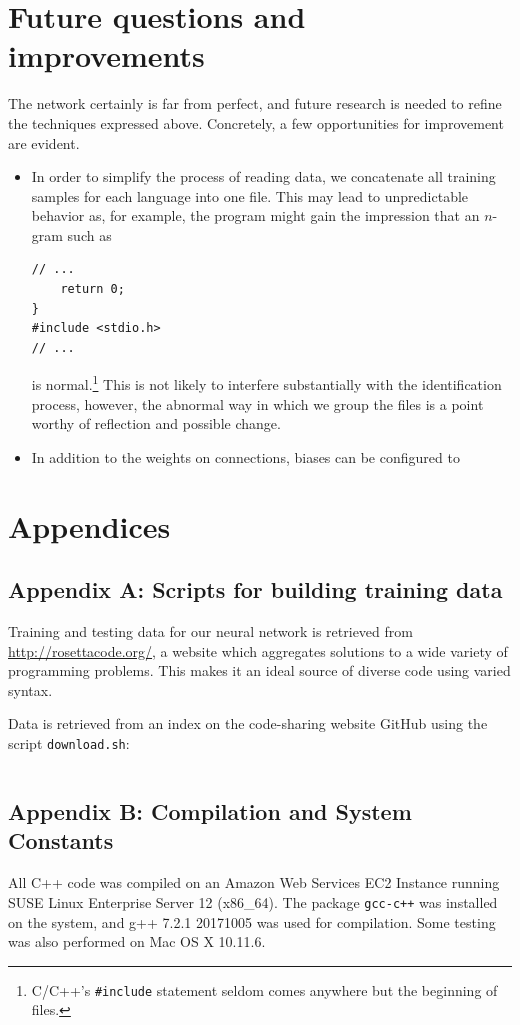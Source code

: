 \documentclass{article}
\begin{document}
\section{Future questions and improvements}
The network certainly is far from perfect, and future research is needed to refine the techniques expressed above. Concretely, a few opportunities for improvement are evident.
\begin{itemize}
  \item{In order to simplify the process of reading data, we concatenate all training samples for each language into one file. This may lead to unpredictable behavior as, for example, the program might gain the impression that an $n$-gram such as
  \begin{verbatim}
// ...
    return 0;
}
#include <stdio.h>
// ...
  \end{verbatim}
  is normal.\footnote{C/C++'s \texttt{\#include} statement seldom comes anywhere but the beginning of files.} This is not likely to interfere substantially with the identification process, however, the abnormal way in which we group the files is a point worthy of reflection and possible change.}
  \item{In addition to the weights on connections, biases can be configured to }

\end{itemize}


\section{Appendices}

\label{sec:appendix_a}
\subsection{Appendix A: Scripts for building training data}
Training and testing data for our neural network is retrieved from \url{http://rosettacode.org/}, a website which aggregates solutions to a wide variety of programming problems. This makes it an ideal source of diverse code using varied syntax.

Data is retrieved from an index on the code-sharing website GitHub\cite{rosettacodegh} using the script \texttt{download.sh}:
\inputminted{bash}{code/data/download.sh}

\label{sec:appendix_b}
\subsection{Appendix B: Compilation and System Constants}
All C++ code was compiled on an Amazon Web Services EC2 Instance running SUSE Linux Enterprise Server 12 (x86\_64). The package \texttt{gcc-c++} was installed on the system, and g++ 7.2.1 20171005 was used for compilation. Some testing was also performed on Mac OS X 10.11.6.
\end{document}
